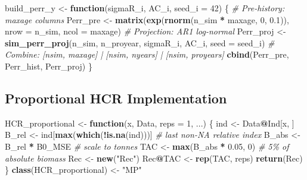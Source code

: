 \documentclass[
]{article}
\newenvironment{Shaded}{\begin{snugshade}}{\end{snugshade}}
\newcommand{\AttributeTok}[1]{\textcolor[rgb]{0.13,0.29,0.53}{#1}}
\newcommand{\CommentTok}[1]{\textcolor[rgb]{0.56,0.35,0.01}{\textit{#1}}}
\newcommand{\ControlFlowTok}[1]{\textcolor[rgb]{0.13,0.29,0.53}{\textbf{#1}}}
\newcommand{\DecValTok}[1]{\textcolor[rgb]{0.00,0.00,0.81}{#1}}
\newcommand{\FloatTok}[1]{\textcolor[rgb]{0.00,0.00,0.81}{#1}}
\newcommand{\FunctionTok}[1]{\textcolor[rgb]{0.13,0.29,0.53}{\textbf{#1}}}
\newcommand{\NormalTok}[1]{#1}
\newcommand{\OtherTok}[1]{\textcolor[rgb]{0.56,0.35,0.01}{#1}}
\newcommand{\SpecialCharTok}[1]{\textcolor[rgb]{0.81,0.36,0.00}{\textbf{#1}}}
\newcommand{\StringTok}[1]{\textcolor[rgb]{0.31,0.60,0.02}{#1}}
\begin{document}
\begin{Shaded}
\begin{Highlighting}[]
\NormalTok{build\_perr\_y }\OtherTok{\textless{}{-}} \ControlFlowTok{function}\NormalTok{(sigmaR\_i, AC\_i, }\AttributeTok{seed\_i =} \DecValTok{42}\NormalTok{) \{}
  \CommentTok{\# Pre{-}history: maxage columns}
\NormalTok{  Perr\_pre  }\OtherTok{\textless{}{-}} \FunctionTok{matrix}\NormalTok{(}\FunctionTok{exp}\NormalTok{(}\FunctionTok{rnorm}\NormalTok{(n\_sim }\SpecialCharTok{*}\NormalTok{ maxage, }\DecValTok{0}\NormalTok{, }\FloatTok{0.1}\NormalTok{)),}
                      \AttributeTok{nrow =}\NormalTok{ n\_sim, }\AttributeTok{ncol =}\NormalTok{ maxage)}
  \CommentTok{\# Projection: AR1 log{-}normal}
\NormalTok{  Perr\_proj }\OtherTok{\textless{}{-}} \FunctionTok{sim\_perr\_proj}\NormalTok{(n\_sim, n\_proyear, sigmaR\_i, AC\_i, }\AttributeTok{seed =}\NormalTok{ seed\_i)}
  \CommentTok{\# Combine: [nsim, maxage] | [nsim, nyears] | [nsim, proyears]}
  \FunctionTok{cbind}\NormalTok{(Perr\_pre, Perr\_hist, Perr\_proj)}
\NormalTok{\}}
\end{Highlighting}
\end{Shaded}

\hypertarget{proportional-hcr-implementation}{%
\subsection{Proportional HCR Implementation}\label{proportional-hcr-implementation}}

\begin{Shaded}
\begin{Highlighting}[]
\NormalTok{HCR\_proportional }\OtherTok{\textless{}{-}} \ControlFlowTok{function}\NormalTok{(x, Data, }\AttributeTok{reps =} \DecValTok{1}\NormalTok{, ...) \{}
\NormalTok{  ind   }\OtherTok{\textless{}{-}}\NormalTok{ Data}\SpecialCharTok{@}\NormalTok{Ind[x, ]}
\NormalTok{  B\_rel }\OtherTok{\textless{}{-}}\NormalTok{ ind[}\FunctionTok{max}\NormalTok{(}\FunctionTok{which}\NormalTok{(}\SpecialCharTok{!}\FunctionTok{is.na}\NormalTok{(ind)))]  }\CommentTok{\# last non{-}NA relative index}
\NormalTok{  B\_abs }\OtherTok{\textless{}{-}}\NormalTok{ B\_rel }\SpecialCharTok{*}\NormalTok{ B0\_MSE                }\CommentTok{\# scale to tonnes}
\NormalTok{  TAC   }\OtherTok{\textless{}{-}} \FunctionTok{max}\NormalTok{(B\_abs }\SpecialCharTok{*} \FloatTok{0.05}\NormalTok{, }\DecValTok{0}\NormalTok{)          }\CommentTok{\# 5\% of absolute biomass}
\NormalTok{  Rec   }\OtherTok{\textless{}{-}} \FunctionTok{new}\NormalTok{(}\StringTok{"Rec"}\NormalTok{)}
\NormalTok{  Rec}\SpecialCharTok{@}\NormalTok{TAC }\OtherTok{\textless{}{-}} \FunctionTok{rep}\NormalTok{(TAC, reps)}
  \FunctionTok{return}\NormalTok{(Rec)}
\NormalTok{\}}
\FunctionTok{class}\NormalTok{(HCR\_proportional) }\OtherTok{\textless{}{-}} \StringTok{"MP"}
\end{Highlighting}
\end{Shaded}
\end{document}
